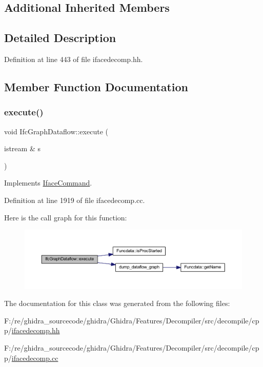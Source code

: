 \subsection*{Additional Inherited Members}


\subsection{Detailed Description}


Definition at line 443 of file ifacedecomp.\+hh.



\subsection{Member Function Documentation}
\mbox{\label{class_ifc_graph_dataflow_a5daf51e3a17da2d71241bbd1e900e8f7}} 
\subsubsection{\texorpdfstring{execute()}{execute()}}
{\footnotesize\ttfamily void Ifc\+Graph\+Dataflow\+::execute (\begin{DoxyParamCaption}\item[{istream \&}]{s }\end{DoxyParamCaption})\hspace{0.3cm}{\ttfamily [virtual]}}



Implements \mbox{\hyperlink{class_iface_command_af10e29cee2c8e419de6efe9e680ad201}{Iface\+Command}}.



Definition at line 1919 of file ifacedecomp.\+cc.

Here is the call graph for this function\+:
\nopagebreak
\begin{figure}[H]
\begin{center}
\leavevmode
\includegraphics[width=350pt]{class_ifc_graph_dataflow_a5daf51e3a17da2d71241bbd1e900e8f7_cgraph}
\end{center}
\end{figure}


The documentation for this class was generated from the following files\+:\begin{DoxyCompactItemize}
\item 
F\+:/re/ghidra\+\_\+sourcecode/ghidra/\+Ghidra/\+Features/\+Decompiler/src/decompile/cpp/\mbox{\hyperlink{ifacedecomp_8hh}{ifacedecomp.\+hh}}\item 
F\+:/re/ghidra\+\_\+sourcecode/ghidra/\+Ghidra/\+Features/\+Decompiler/src/decompile/cpp/\mbox{\hyperlink{ifacedecomp_8cc}{ifacedecomp.\+cc}}\end{DoxyCompactItemize}
